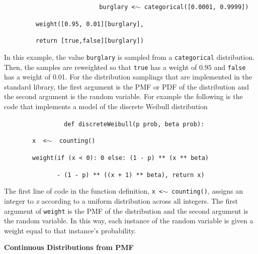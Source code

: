 \documentclass[22pt]{beamer}
\newenvironment{variableblock}[3]{%
  \setbeamercolor{block body}{#2}
  \setbeamercolor{block title}{#3}
  \begin{block}{#1}}{\end{block}}
\begin{document}
\begin{frame}[fragile]
\begin{textblock}{5}
\begin{variableblock}{}{}{}
\begin{center}
\justifying
~~~~~~~~~~~~~~~~~~~~~~~~~~\tt{ \small{burglary {\color{green}<$\sim$} {\color{blue}categorical}([{\color{purple}0.0001}, {\color{purple}0.9999}])}}

~~~~~~~~~\tt{\small{{\color{blue}weight}([{\color{purple}0.95}, {\color{purple}0.01}][burglary],}}

~~~~~~~~~\tt{\small{{\color{red}return} [{\color{red}true},{\color{red}false}][burglary])}}
\end{center}

\bigskip

\tiny{In this example, the value {\tt \tiny{burglary}} is sampled from a {\tt \tiny{categorical}} distribution. Then, the samples are reweighted so that {\tt \tiny{true}} has a weight of $0.95$ and {\tt \tiny{false}} has a weight of 0.01. For the distribution samplings that are implemented in the standard library, the first argument is the PMF or PDF of the distribution and the second argument is the random variable. For example the following is the code that implements a model of the discrete Weibull distribution}

\begin{center}
\justifying
~~~~~~~~~~~~~~~~~\tt{\small{{\color{red}def} {\color{blue}discreteWeibull}(p {\color{green}prob}, beta {\color{green}prob}):}}

~~~~~~~~\tt{\small {x {\color{green} <$\sim$} {\color{blue} counting}()}}

~~~~~~~~\tt{\small{{\color{blue}weight}({\color{red}if} (x {\color{green}<} {\color{purple}0}):~{\color{purple}0} {\color{red}else}:~({\color{purple}1}~{\color{green}-}~p)~{\color{green}**}~(x~{\color{green}**}~beta) }}

~~~~~~~~~~~~~~~\tt{\small{{\color{green}-} ({\color{purple}1~}{\color{green}-}~p){\color{green}~**~}((x{\color{green}~+}{\color{purple}~1}){\color{green}~**~}beta), {\color{red}return} x)}}
\end{center}

\bigskip

\tiny{The first line of code in the function definition, {\tt \tiny{x <$\sim$ counting()}}, assigns an integer to \textit{x} according to a uniform distribution across all integers.
The first argument of {\tt \tiny{weight}} is the PMF of the distribution and the second argument is the random variable. In this way, each instance of the random variable is given a weight equal to that instance's probability.
}

\small{\textbf{Continuous Distributions from PMF}}


\end{variableblock}
\end{textblock}
\end{frame}
\end{document}
